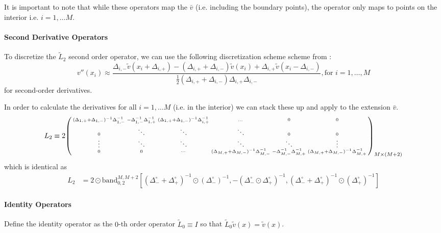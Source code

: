 \documentclass[11pt]{article}
\newcommand{\band}{\ensuremath{\mathrm{band}}}
\newenvironment{psmallmatrix}
{\left(\begin{smallmatrix}}
	{\end{smallmatrix}\right)}
\theoremstyle{definition}
\begin{document}
It is important to note that while these operators map the $\bar{v}$ (i.e. including the boundary points), the operator only maps to points on the interior i.e. $i = 1, \ldots M$.



\paragraph{Second Derivative Operators}
To discretize the $\tilde{L}_2$ second order operator, we can use the following discretization scheme scheme from \cite{achdou17}:
\begin{equation}
v''(x_i) \approx \dfrac{ \Delta_{i,-} \tilde{v}( x_i + \Delta_{i,+}) - (\Delta_{i,+} + \Delta_{i,-}) \tilde{v}( x_i ) + \Delta_{i,+} \tilde{v}( x_i - \Delta_{i,-})}{\frac{1}{2}(\Delta_{i,+} + \Delta_{i,-}) \Delta_{i,+} \Delta_{i,-} }, \text{for } i = 1, \ldots, M
\end{equation}
for second-order derivatives.


In order to calculate the derivatives for all $i = 1, \ldots M$ (i.e. in the interior) we can stack these up and apply to the extension $\bar{v}$.
\begin{align}\label{eq:L-2-extended} \small
{L}_2 \equiv 2 \begin{psmallmatrix}
(\Delta_{1,+}+\Delta_{1,-})^{-1}\Delta_{1,-}^{-1} &-\Delta_{1,-}^{-1} \Delta_{1,+}^{-1}  & (\Delta_{1,+}+\Delta_{1,-})^{-1} \Delta_{i,+}^{-1}&\dots&0&0\\
0 & \ddots & \ddots &\ddots & 0 & 0\\
\vdots&\ddots &\ddots & \ddots & \ddots & \vdots\\
0&0&\cdots&
(\Delta_{M,+}+\Delta_{M,-})^{-1}\Delta_{M,-}^{-1} &-\Delta_{M,-}^{-1} \Delta_{M,+}^{-1}  &
(\Delta_{M,+}+\Delta_{M,-})^{-1}\Delta_{M,+}^{-1}
\end{psmallmatrix}_{M\times (M+2)} 
\end{align}
which is identical as
\begin{align}
L_2 &= 2 \odot \band_{0,2}^{M,M+2} \left[(\Delta_-^\circ + \Delta_+^\circ)^{-1} \odot (\Delta_{-}^\circ)^{-1}, -(\Delta_-^\circ \odot \Delta_+^\circ)^{-1} , (\Delta_-^\circ + \Delta_+^\circ)^{-1} \odot (\Delta_{+}^\circ)^{-1} \right]
\end{align}


\paragraph{Identity Operators}
Define the identity operator as the $0$-th order operator $\tilde{L}_0 \equiv I$ so that $\tilde{L}_0 \tilde{v}(x) = \tilde{v}(x)$.
\end{document}
